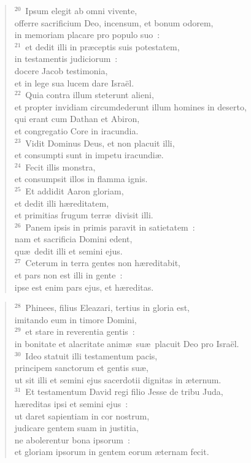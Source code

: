 \begin{verse}
${}^{20}$~Ipsum elegit ab omni vivente,\\ offerre sacrificium Deo, incensum, et bonum odorem,\\ in memoriam placare pro populo suo~:\\
${}^{21}$~et dedit illi in pr\ae ceptis suis potestatem,\\ in testamentis judiciorum~:\\ docere Jacob testimonia,\\ et in lege sua lucem dare Isra\"el.\\
${}^{22}$~Quia contra illum steterunt alieni,\\ et propter invidiam circumdederunt illum homines in deserto,\\ qui erant cum Dathan et Abiron,\\ et congregatio Core in iracundia.\\
${}^{23}$~Vidit Dominus Deus, et non placuit illi,\\ et consumpti sunt in impetu iracundi\ae .\\
${}^{24}$~Fecit illis monstra,\\ et consumpsit illos in flamma ignis.\\
${}^{25}$~Et addidit Aaron gloriam,\\ et dedit illi h\ae reditatem,\\ et primitias frugum terr\ae\ divisit illi.\\
${}^{26}$~Panem ipsis in primis paravit in satietatem~:\\ nam et sacrificia Domini edent,\\ qu\ae\ dedit illi et semini ejus.\\
${}^{27}$~Ceterum in terra gentes non h\ae reditabit,\\ et pars non est illi in gente~:\\ ipse est enim pars ejus, et h\ae reditas.\end{verse}


\begin{verse}${}^{28}$~Phinees, filius Eleazari, tertius in gloria est,\\ imitando eum in timore Domini,\\
${}^{29}$~et stare in reverentia gentis~:\\ in bonitate et alacritate anim\ae\ su\ae\ placuit Deo pro Isra\"el.\\
${}^{30}$~Ideo statuit illi testamentum pacis,\\ principem sanctorum et gentis su\ae ,\\ ut sit illi et semini ejus sacerdotii dignitas in \ae ternum.\\
${}^{31}$~Et testamentum David regi filio Jesse de tribu Juda,\\ h\ae reditas ipsi et semini ejus~:\\ ut daret sapientiam in cor nostrum,\\ judicare gentem suam in justitia,\\ ne abolerentur bona ipsorum~:\\ et gloriam ipsorum in gentem eorum \ae ternam fecit.\end{verse}


